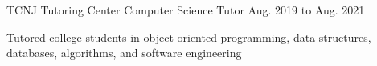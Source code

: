 \begin{cventry}
    {TCNJ Tutoring Center}
    {Computer Science Tutor}
    {Aug. 2019 to Aug. 2021}
    {}{}
    \begin{cvitems}
        \item Tutored college students in object-oriented programming, data structures, databases, algorithms, and software engineering

    \end{cvitems}
\end{cventry}



\begin{comment}
    \begin{cventry}
        {The College of New Jersey (TCNJ)}
        {Computer Science Department Tutor}
        {Apr. 2018 to May 2019}
        {Java, C++, C, Ruby, PostgreSQL, Regular Expressions}{Rails}
        \begin{cvitems}
            \item Tutoring TCNJ students in computer science coursework concerning topics such as object-oriented programming, data structures, discrete math, algorithms, computer architecture, operating systems, databases, and software engineering.
        \end{cvitems}
    \end{cventry}
\end{comment}

